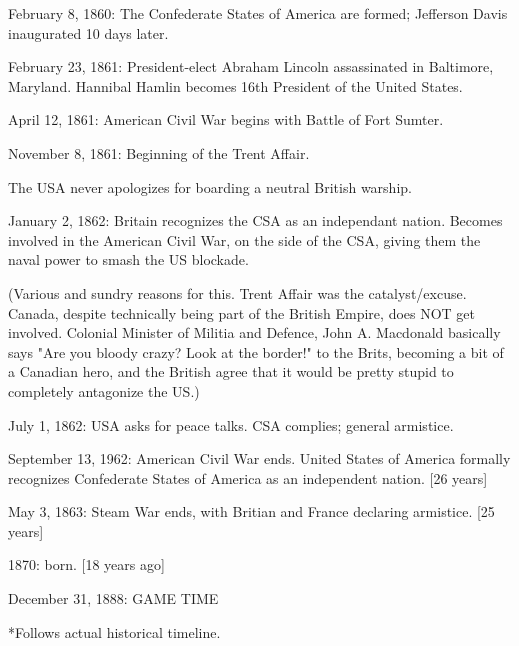 \documentclass[white]{airship}
\begin{document}
February 8, 1860: The Confederate States of America are formed;
Jefferson Davis inaugurated 10 days later.

February 23, 1861: President-elect Abraham Lincoln assassinated in
Baltimore, Maryland.  Hannibal Hamlin becomes 16th President of the
United States.

April 12, 1861: American Civil War begins with Battle of Fort Sumter.

November 8, 1861: Beginning of the Trent Affair.

The USA never apologizes for boarding a neutral British warship.

January 2, 1862: Britain recognizes the CSA as an independant nation.
Becomes involved in the American Civil War, on the side of the CSA,
giving them the naval power to smash the US blockade.

(Various and sundry reasons for this.  Trent Affair was the
catalyst/excuse.  Canada, despite technically being part of the
British Empire, does NOT get involved.  Colonial Minister of Militia
and Defence, John A. Macdonald basically says "Are you bloody crazy?
Look at the border!" to the Brits, becoming a bit of a Canadian hero,
and the British agree that it would be pretty stupid to completely
antagonize the US.)

July 1, 1862: USA asks for peace talks.  CSA complies; general armistice.

September 13, 1962: American Civil War ends.  United States of America formally recognizes Confederate States of America as an independent nation.
[26 years]

May 3, 1863: Steam War ends, with Britian and France declaring armistice.
[25 years]

1870: \cTheif{} born. [18 years ago]

December 31, 1888: GAME TIME

*Follows actual historical timeline.
\end{document}
